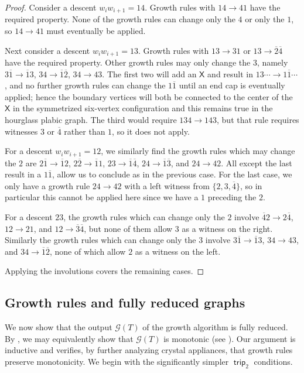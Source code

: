 \documentclass{amsart}
\theoremstyle{definition}
\theoremstyle{remark}
\numberwithin{equation}{section}
\DeclareMathOperator{\trip}{\mathsf{trip}}
\begin{document}
\begin{proof}
  Consider a descent $w_i w_{i+1} = 14$. Growth rules with $14 \to 41$ have the required property. None of the growth rules can change only the $4$ or only the $1$, so $14 \to 41$ must eventually be applied.
  
  Next consider a descent $w_i w_{i+1}=13$. Growth rules with $13 \to 31$ or $13 \to \overline{2}\overline{4}$ have the required property. Other growth rules may only change the $3$, namely $3\overline{1} \to \overline{1}3$, $34 \to \overline{1}\overline{2}$, $34 \to 43$. The first two will add an $\mathsf{X}$ and result in $13\cdots \to 1\overline{1}\cdots$, and no further growth rules can change the $1 \overline{1}$ until an end cap is eventually applied; hence the boundary vertices will both be connected to the center of the $\mathsf{X}$ in the symmetrized six-vertex configuration and this remains true in the hourglass plabic graph. The third would require $134 \to 143$, but that rule requires witnesses $3$ or $\overline{4}$ rather than $1$, so it does not apply.

  For a descent $w_i w_{i+1}=12$, we similarly find the growth rules which may change the $2$ are $2\overline{1} \to \overline{1}2$, $2\overline{2} \to \overline{1}1$, $23 \to \overline{1}\overline{4}$, $24 \to \overline{1}\overline{3}$, and $24 \to 42$. All except the last result in a $1\overline{1}$, allow us to conclude as in the previous case. For the last case, we only have a growth rule $24 \to 42$ with a left witness from $\{2,3,\overline{4}\}$, so in particular this cannot be applied here since we have a $1$ preceding the $2$.

  For a descent $23$, the growth rules which can change only the $2$ involve $\overline{4}2 \to 2\overline{4}$, $12 \to 21$, and $12 \to \overline{3}\overline{4}$, but none of them allow $3$ as a witness on the right. Similarly the growth rules which can change only the $3$ involve $3\overline{1} \to \overline{1}3$, $34 \to 43$, and $34 \to \overline{1}\overline{2}$, none of which allow $2$ as a witness on the left.

  Applying the involutions covers the remaining cases.
\end{proof}

\subsection{Growth rules and fully reduced graphs}\label{sec:growth-reduced}

We now show that the output $\mathcal{G}(T)$ of the growth algorithm is fully reduced. By , we may equivalently show that $\mathcal{G}(T)$ is monotonic (see ). Our argument is inductive and verifies,  by further analyzing crystal appliances, that growth rules preserve monotonicity. We begin with the significantly simpler $\trip_2$ conditions.
\end{document}
